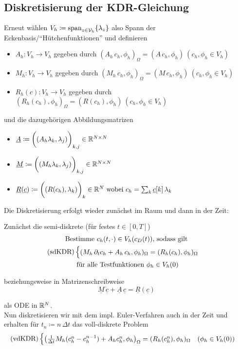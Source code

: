 \subsection{Diskretisierung der KDR-Gleichung}
Erneut wählen $ V_h \coloneqq \operatorname{span}_{z \in \mathcal{V}_h} \{ \lambda_z \} $ also Spann der Eckenbasis/\enquote{Hütchenfunktionen} und definieren
\begin{itemize}
	\item $ A_h: V_h \to V_h $ gegeben durch $ (A_h \, c_h, \phi_h)_\Omega = (A \, c_h, \phi_h) \ (c_h, \phi_h \in V_h)$
	\item $ M_h: V_h \to V_h $ gegeben durch $ (M_h \, c_h, \phi_h)_\Omega = (M \, c_h, \phi_h) \ (c_h, \phi_h \in V_h)$
	\item $ R_h(c): V_h \to V_h $ gegeben durch $ (R_h(c_h), \phi_h)_\Omega = (R(c_h), \phi_h) \ (c_h, \phi_h \in V_h)$
\end{itemize}
und die dazugehörigen Abbildungsmatrizen
\begin{itemize}
	\item $\underline{A} \coloneqq \bigg( (A_h \lambda_k, \lambda_j) \bigg)_{k,j} \in \mathbb{R}^{N \times N}$
	\item $\underline{M} \coloneqq \bigg( (M_h \lambda_k, \lambda_j) \bigg)_{k,j} \in \mathbb{R}^{N \times N}$
	\item $ \underline{R}(\underline{c}) \coloneqq \bigg( (R(c_h),\lambda_k) \bigg)_k \in \mathbb{R}^N \text{ wobei } c_h = \sum_k \underline{c}[k] \, \lambda_k $
\end{itemize}
Die Diskretisierung erfolgt wieder zunächst im Raum und dann in der Zeit:

Zunächst die semi-diskrete  (für festes $ t \in [0,T]$) 
\begin{gather*}
	\text{Bestimme } c_h(t,\cdot) \in V_h(c_D(t)) \text{, sodass gilt}\\
	\operatorname{(sdKDR)}\begin{cases}
		(M_h \, \partial_t c_h + A_h \, c_h, \phi_h)_\Omega = (R_h(c_h), \phi_h)_\Omega
	\end{cases}\\
	\text{ für alle Testfunktionen } \phi_h \in V_h(0) 
\end{gather*}

beziehungsweise in Matrizenschreibweise 
\[ \underline{M} \, \underline{\dot{c}} + \underline{A} \, \underline{c} = \underline{R}(\underline{c})  \]

als ODE in $ \mathbb{R}^N $.\\
Nun diskretisieren wir mit dem impl. Euler-Verfahren auch in der Zeit und erhalten für $ t_n \coloneqq n \, \Delta t  $ das voll-diskrete Problem
\begin{gather*}
\operatorname{(vdKDR)} \begin{cases}
	\left( \frac{1}{\Delta t} M_h(c_h^n - c_h^{n-1}) + A_h c_h^n, \phi_h \right)_\Omega = (R_h(c_h^n),\phi_h)_\Omega \quad (\phi_h \in V_h(0))
\end{cases}
\end{gather*}

